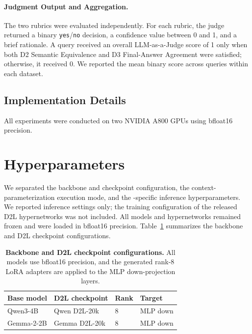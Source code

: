 \paragraph{Judgment Output and Aggregation.}
\label{app:rubric-aggregation}

The two rubrics were evaluated independently. For each rubric, the judge returned a binary \texttt{yes}/\texttt{no} decision, a confidence value between 0 and 1, and a brief rationale. A query received an overall LLM-as-a-Judge score of 1 only when both D2 Semantic Equivalence and D3 Final-Answer Agreement were satisfied; otherwise, it received 0. We reported the mean binary score across queries within each dataset.

\subsection{Implementation Details}
\label{app:implementation-details}

All experiments were conducted on two NVIDIA A800 GPUs using bfloat16 precision.


\section{Hyperparameters}
\label{app:hyperparameters}

We separated the backbone and checkpoint configuration, the context-parameterization execution mode, and the \method{}-specific inference hyperparameters. We reported inference settings only; the training configuration of the released D2L hypernetworks was not included. All models and hypernetworks remained frozen and were loaded in bfloat16 precision. Table~\ref{tab:model-d2l-settings} summarizes the backbone and D2L checkpoint configurations.

\begin{table}[tb]
\centering
\small
\renewcommand{\arraystretch}{1.18}
\setlength{\tabcolsep}{4pt}
\begin{tabular}{llll}
\toprule
\textbf{Base model} & \textbf{D2L checkpoint} & \textbf{Rank} & \textbf{Target} \\
\midrule
Qwen3-4B & Qwen D2L-20k & 8 & MLP down \\
Gemma-2-2B & Gemma D2L-20k & 8 & MLP down \\
\bottomrule
\end{tabular}
\caption{\textbf{Backbone and D2L checkpoint configurations.} All models use bfloat16 precision, and the generated rank-8 LoRA adapters are applied to the MLP down-projection layers.}
\label{tab:model-d2l-settings}
\end{table}

